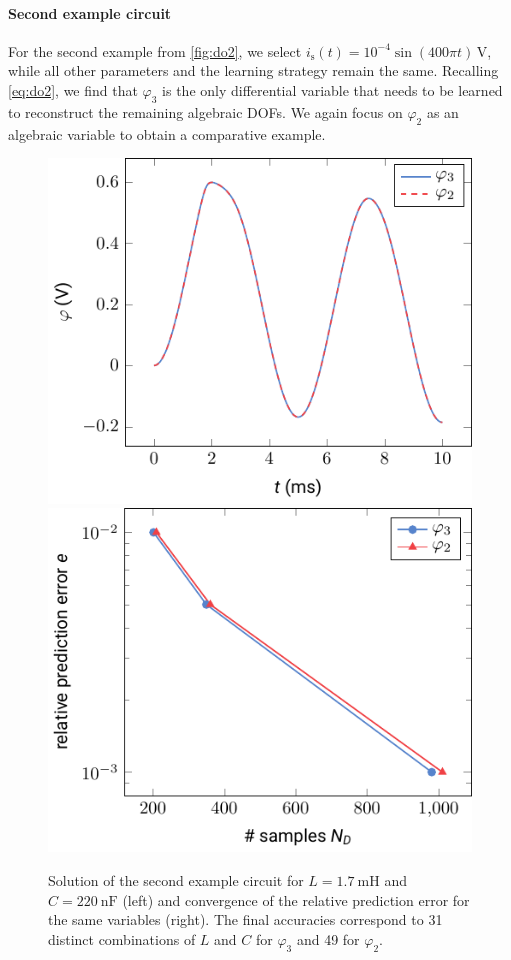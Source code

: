 \documentclass[AMA,STIX1COL]{WileyNJD-v2}
\newcommand{\mr}[1]{\mathrm{#1}}
\begin{document}
\paragraph{Second example circuit}
For the second example from \autoref{fig:do2}, we select $i_\mr{s}(t) = 10^{-4} \sin(400 \pi t)\, \si{\volt}$, while all other parameters and the learning strategy remain the same. Recalling \eqref{eq:do2}, we find that $\varphi_3$ is the only differential variable that needs to be learned to reconstruct the remaining algebraic DOFs. We again focus on $\varphi_2$ as an algebraic variable to obtain a comparative example.
\begin{figure}[b]
    \begin{center}
        \includegraphics[width=.4\textwidth]{do2_solution_phi} \hspace{1.5cm} \includegraphics[width=.4\textwidth]{do2_convergence}
    \end{center}
    \caption{Solution of the second example circuit for $L = \SI{1.7}{\milli\henry}$ and $C = \SI{220}{\nano\farad}$ (left) and convergence of the relative prediction error for the same variables (right). The final accuracies correspond to 31 distinct combinations of $L$ and $C$ for $\varphi_3$ and 49 for $\varphi_2$.}
    \label{fig:do2_solution_convergence}
\end{figure}
\end{document}
